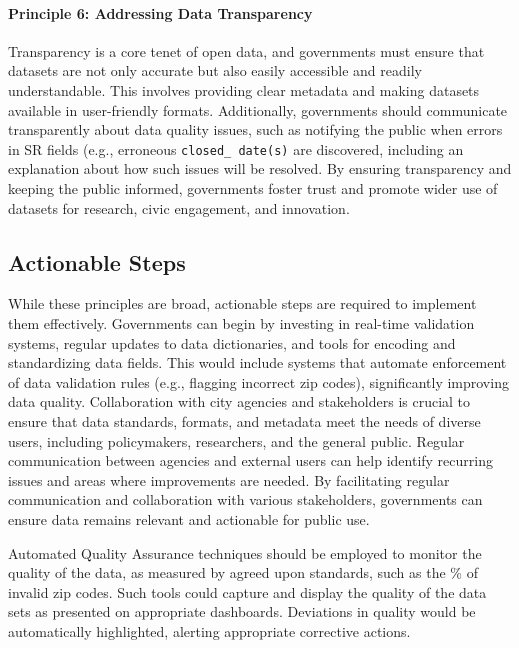 \documentclass[linenumber]{jdsart}
\begin{document}
\paragraph{Principle 6: Addressing Data Transparency}
Transparency is a core tenet of open data, and governments must ensure 
that datasets are not only accurate but also easily accessible and 
readily understandable. This involves providing clear 
metadata and making datasets available in user-friendly 
formats. Additionally, governments should communicate transparently about 
data quality issues, such as notifying the public when errors in SR 
fields (e.g., erroneous \texttt{closed\_ date(s)} are discovered, including
an explanation about how such issues will be resolved. By 
ensuring transparency and keeping the public informed, 
governments foster trust and promote wider use of datasets 
for research, civic engagement, and innovation.


\subsection{Actionable Steps}
While these principles are broad, actionable steps are required to 
implement them effectively. Governments can begin by investing in 
real-time validation systems, regular updates to data dictionaries, 
and tools for encoding and standardizing data fields. This would include
systems that automate enforcement of data validation rules 
(e.g., flagging incorrect zip codes), significantly improving data 
quality. Collaboration with city agencies and stakeholders is crucial 
to ensure that data standards, formats, and metadata meet the needs 
of diverse users, including policymakers, researchers, and the 
general public. Regular communication between agencies and external 
users can help identify recurring issues and areas where improvements 
are needed. By facilitating regular communication and collaboration 
with various stakeholders, governments can ensure data remains relevant 
and actionable for public use.


Automated Quality Assurance techniques should be employed to 
monitor the quality of the data, as measured by agreed upon
standards, such as the \% of invalid zip codes. Such tools could
capture and display the quality of the data sets as presented
on appropriate dashboards. Deviations in quality would be
automatically highlighted, alerting appropriate corrective actions.
\end{document}
